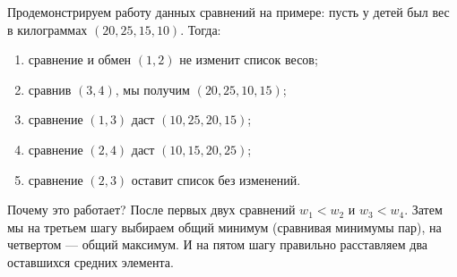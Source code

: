 \begin{itemize}
Продемонстрируем работу данных сравнений на примере: пусть у детей был вес в килограммах
$(20,25,15,10)$. Тогда:
\begin{enumerate}
\item сравнение и обмен $(1,2)$ не изменит список весов; 
\item сравнив $(3,4)$, мы получим $(20,25,10,15)$; 
\item сравнение $(1,3)$ даст $(10,25,20,15)$; 
\item сравнение $(2,4)$ даст $(10,15,20,25)$; 
\item сравнение $(2,3)$ оставит список без изменений.
\end{enumerate}

Почему это работает? После первых двух сравнений $w_1 < w_2$
и $w_3 < w_4$. Затем мы на третьем шагу выбираем общий минимум 
(сравнивая минимумы пар), на четвертом --- общий максимум. 
И на пятом шагу правильно расставляем два оставшихся средних элемента.

\end{itemize}
